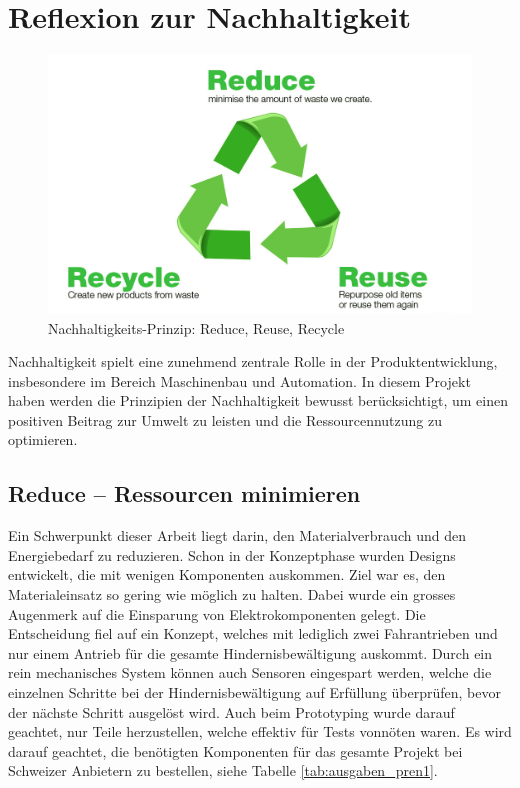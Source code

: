 \documentclass[../main.tex]{subfiles}
\begin{document}
\newpage
\section{Reflexion zur Nachhaltigkeit}

\begin{figure}[H] %
    \centering
        \includegraphics[width=0.7\linewidth]{img/nachhaltigkeit/3R-reduce-reuse-recycle.jpg}
        \caption[Nachhaltigkeits-Prinzip: Reduce, Reuse, Recycle]{Nachhaltigkeits-Prinzip: Reduce, Reuse, Recycle \footnotemark}
        
        \label{fig:3R}
    \end{figure} 


Nachhaltigkeit spielt eine zunehmend zentrale Rolle in der Produktentwicklung, insbesondere im Bereich Maschinenbau und Automation. In diesem Projekt haben werden die Prinzipien der Nachhaltigkeit bewusst berücksichtigt, um einen positiven Beitrag zur Umwelt zu leisten und die Ressourcennutzung zu optimieren.

\subsection{Reduce – Ressourcen minimieren}

Ein Schwerpunkt dieser Arbeit liegt darin, den Materialverbrauch und den Energiebedarf zu reduzieren. Schon in der Konzeptphase wurden Designs entwickelt, die mit wenigen Komponenten auskommen. Ziel war es, den Materialeinsatz so gering wie möglich zu halten. Dabei wurde ein grosses Augenmerk auf die Einsparung von Elektrokomponenten gelegt. Die Entscheidung fiel auf ein Konzept, welches mit lediglich zwei Fahrantrieben und nur einem Antrieb für die gesamte Hindernisbewältigung auskommt. Durch ein rein mechanisches System können auch Sensoren eingespart werden, welche die einzelnen Schritte bei der Hindernisbewältigung auf Erfüllung überprüfen, bevor der nächste Schritt ausgelöst wird. Auch beim Prototyping wurde darauf geachtet, nur Teile herzustellen, welche effektiv für Tests vonnöten waren. Es wird darauf geachtet, die benötigten Komponenten für das gesamte Projekt bei Schweizer Anbietern zu bestellen, siehe Tabelle \ref{tab:ausgaben_pren1}.
\end{document}
